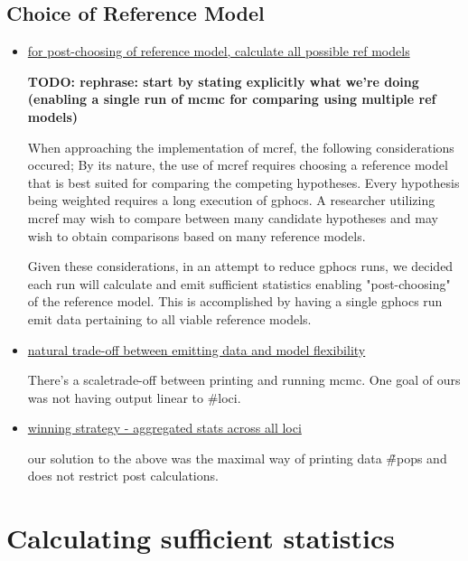 \documentclass[11pt]{article}
\begin{document}
\subsection{Choice of Reference Model}
\begin{itemize}
\item \underline{for post-choosing of reference model, calculate all possible ref models}

 \textbf{TODO: rephrase: start by stating explicitly what we're doing (enabling a single run of mcmc for comparing using multiple ref models)		}
 
When approaching the implementation of mcref, the following considerations occured; By its nature, the use of mcref requires choosing a reference model that is best suited for comparing the competing hypotheses. Every hypothesis being weighted requires a long execution of gphocs. A researcher utilizing mcref may wish to compare between many candidate hypotheses and may wish to obtain comparisons based on many reference models.

Given these considerations, in an attempt to reduce gphocs runs, we decided each run will calculate and emit sufficient statistics enabling "post-choosing" of the reference model. This is accomplished by having a single gphocs run emit data pertaining to all viable reference models.

\item \underline{natural trade-off between emitting data and model flexibility}

There's a scale\/trade-off between printing and running mcmc. One goal of ours was not having output linear to \#loci. 

\item \underline{winning strategy - aggregated stats across all loci}
	
our solution to the above was the maximal way of printing data \~\#pops and does not restrict post calculations. 

\end{itemize}


\section{Calculating sufficient statistics}
\end{document}
